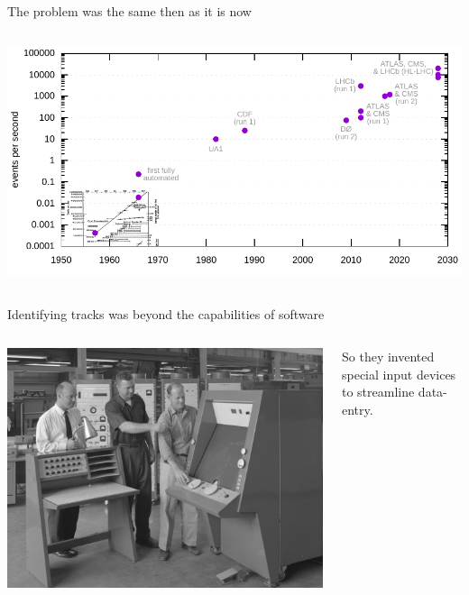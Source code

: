 \documentclass[aspectratio=169]{beamer}
\begin{document}
\begin{frame}{The problem was the same then as it is now}
\vspace{0.25 cm}
\begin{columns}
\includegraphics[width=\linewidth]{PLOTS/event-rates.pdf}
\end{columns}
\end{frame}

\begin{frame}{Identifying tracks was beyond the capabilities of software}
\Large
\vspace{0.35 cm}
\begin{columns}
\includegraphics[width=\linewidth]{PLOTS/franckenstein-2.jpg}

So they invented special input devices to streamline data-entry.

\end{columns}
\end{frame}
\end{document}
